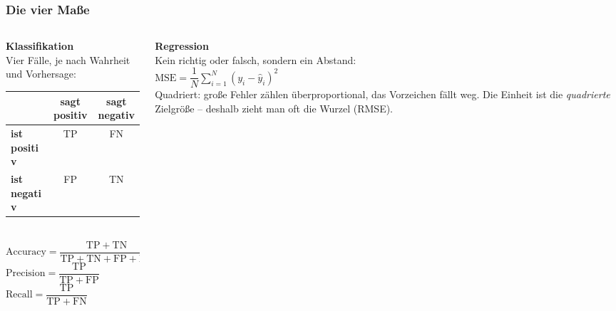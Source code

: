 \begin{frame}
  \frametitle{Die vier Maße\pruefungsfrage}

  \begin{columns}[t]
    \begin{column}{0.54\textwidth}
      \textbf{Klassifikation}\\[4pt]
      {\footnotesize Vier Fälle, je nach Wahrheit und Vorhersage:}\\[4pt]
      {\footnotesize
      \begin{tabular}{l|cc}
        & \textbf{sagt positiv} & \textbf{sagt negativ}\\\hline
        \textbf{ist positiv} & TP & FN\\
        \textbf{ist negativ} & FP & TN\\
      \end{tabular}}\\[10pt]
      {\small
      $\text{Accuracy} = \dfrac{\mathrm{TP} + \mathrm{TN}}{\mathrm{TP} + \mathrm{TN} + \mathrm{FP} + \mathrm{FN}}$\\[8pt]
      $\text{Precision} = \dfrac{\mathrm{TP}}{\mathrm{TP} + \mathrm{FP}}$ \\[8pt]
      $\text{Recall} = \dfrac{\mathrm{TP}}{\mathrm{TP} + \mathrm{FN}}$ }
    \end{column}
    \begin{column}{0.44\textwidth}
      \textbf{Regression}\\[4pt]
      {\footnotesize Kein richtig oder falsch, sondern ein Abstand:}\\[10pt]
      {\small $\text{MSE} = \dfrac{1}{N}\displaystyle\sum_{i=1}^{N}\left(y_i - \hat{y}_i\right)^2$}\\[10pt]
      {\footnotesize Quadriert: große Fehler zählen überproportional, das Vorzeichen fällt weg.
      Die Einheit ist die \emph{quadrierte} Zielgröße -- deshalb zieht man oft die Wurzel (RMSE).}
    \end{column}
  \end{columns}

\end{frame}


